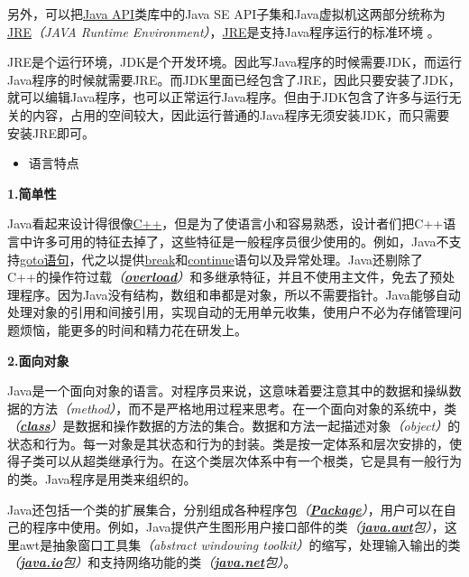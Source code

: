 \documentclass[
]{article}
\begin{document}
另外，可以把\href{https://baike.baidu.com/item/Java\%20API}{Java
API}类库中的Java SE
API子集和Java虚拟机这两部分统称为\href{https://baike.baidu.com/item/JRE}{JRE}\emph{（JAVA
Runtime
Environment）}，\href{https://baike.baidu.com/item/JRE}{JRE}是支持Java程序运行的标准环境
。

JRE是个运行环境，JDK是个开发环境。因此写Java程序的时候需要JDK，而运行Java程序的时候就需要JRE。而JDK里面已经包含了JRE，因此只要安装了JDK，就可以编辑Java程序，也可以正常运行Java程序。但由于JDK包含了许多与运行无关的内容，占用的空间较大，因此运行普通的Java程序无须安装JDK，而只需要安装JRE即可。

\begin{itemize}
\item
  语言特点
\end{itemize}

\textbf{1.简单性}

Java看起来设计得很像\href{https://baike.baidu.com/item/C\%2B\%2B}{C++}，但是为了使语言小和容易熟悉，设计者们把C++语言中许多可用的特征去掉了，这些特征是一般程序员很少使用的。例如，Java不支持\href{https://baike.baidu.com/item/goto语句/7603004}{goto语句}，代之以提供\href{https://baike.baidu.com/item/break/405784}{break}和\href{https://baike.baidu.com/item/continue/3009735}{continue}语句以及异常处理。Java还剔除了C++的操作符过载\emph{（\textbf{\href{https://baike.baidu.com/item/overload/5090058}{overload}}）}和多继承特征，并且不使用主文件，免去了预处理程序。因为Java没有结构，数组和串都是对象，所以不需要指针。Java能够自动处理对象的引用和间接引用，实现自动的无用单元收集，使用户不必为存储管理问题烦恼，能更多的时间和精力花在研发上。

\textbf{2.面向对象}

Java是一个面向对象的语言。对程序员来说，这意味着要注意其中的数据和操纵数据的方法\emph{（method）}，而不是严格地用过程来思考。在一个面向对象的系统中，类\emph{（\textbf{\href{https://baike.baidu.com/item/class/12502737}{class}}）}是数据和操作数据的方法的集合。数据和方法一起描述对象\emph{（object）}的状态和行为。每一对象是其状态和行为的封装。类是按一定体系和层次安排的，使得子类可以从超类继承行为。在这个类层次体系中有一个根类，它是具有一般行为的类。Java程序是用类来组织的。

Java还包括一个类的扩展集合，分别组成各种程序包\emph{（\textbf{\href{https://baike.baidu.com/item/Package}{Package}}）}，用户可以在自己的程序中使用。例如，Java提供产生图形用户接口部件的类\emph{（\textbf{\href{https://baike.baidu.com/item/java.awt}{java.awt}}包）}，这里awt是抽象窗口工具集\emph{（abstract
windowing
toolkit）}的缩写，处理输入输出的类\emph{（\textbf{\href{https://baike.baidu.com/item/java.io}{java.io}}包）}和支持网络功能的类\emph{（\textbf{\href{https://baike.baidu.com/item/java.net}{java.net}}包）}。
\end{document}
